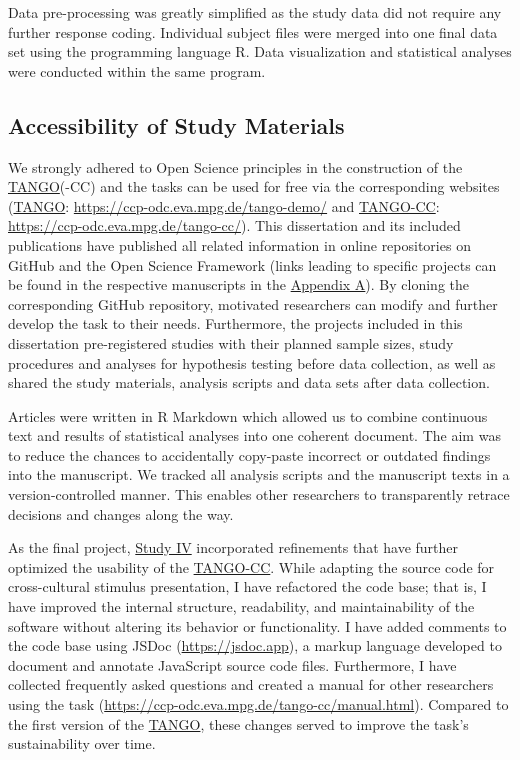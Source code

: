 \documentclass[
]{scrbook}
\begin{document}
Data pre-processing was greatly simplified as the study data did not require any further response coding. Individual subject files were merged into one final data set using the programming language R. Data visualization and statistical analyses were conducted within the same program.

\subsection{Accessibility of Study Materials}\label{approach-accessibility}

We strongly adhered to Open Science principles in the construction of the \hyperref[acronyms_TANGO]{TANGO}(-CC) and the tasks can be used for free via the corresponding websites (\hyperref[acronyms_TANGO]{TANGO}: \mbox{\url{https://ccp-odc.eva.mpg.de/tango-demo/}} and \hyperref[acronyms_TANGO-CC]{TANGO-CC}: \mbox{\url{https://ccp-odc.eva.mpg.de/tango-cc/}}). This dissertation and its included publications have published all related information in online repositories on GitHub and the Open Science Framework (links leading to specific projects can be found in the respective manuscripts in the \hyperref[appendixA]{Appendix A}). By cloning the corresponding GitHub repository, motivated researchers can modify and further develop the task to their needs. Furthermore, the projects included in this dissertation pre-registered studies with their planned sample sizes, study procedures and analyses for hypothesis testing before data collection, as well as shared the study materials, analysis scripts and data sets after data collection.

Articles were written in R Markdown which allowed us to combine continuous text and results of statistical analyses into one coherent document. The aim was to reduce the chances to accidentally copy-paste incorrect or outdated findings into the manuscript. We tracked all analysis scripts and the manuscript texts in a version-controlled manner. This enables other researchers to transparently retrace decisions and changes along the way.

As the final project, \hyperref[studyIV]{Study IV} incorporated refinements that have further optimized the usability of the \hyperref[acronyms_TANGO-CC]{TANGO-CC}. While adapting the source code for cross-cultural stimulus presentation, I have refactored the code base; that is, I have improved the internal structure, readability, and maintainability of the software without altering its behavior or functionality. I have added comments to the code base using JSDoc (\mbox{\url{https://jsdoc.app}}), a markup language developed to document and annotate JavaScript source code files. Furthermore, I have collected frequently asked questions and created a manual for other researchers using the task (\mbox{\url{https://ccp-odc.eva.mpg.de/tango-cc/manual.html}}). Compared to the first version of the \hyperref[acronyms_TANGO]{TANGO}, these changes served to improve the task's sustainability over time.
\end{document}
